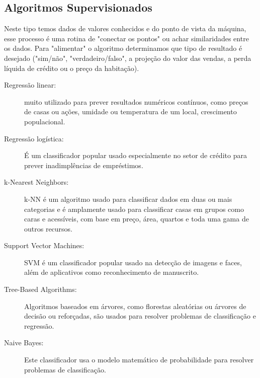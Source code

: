 \subsection{Algoritmos Supervisionados}
Neste tipo temos dados de valores conhecidos e do ponto de vista da máquina, esse processo é uma rotina de "conectar os pontos" ou achar similaridades entre os dados. Para "alimentar" o algoritmo determinamos que tipo de resultado é desejado ("sim/não", "verdadeiro/falso", a projeção do valor das vendas, a perda líquida de crédito ou o preço da habitação).
\begin{description}
	\item[Regressão linear:] muito utilizado para prever resultados numéricos contínuos, como preços de casas ou ações, umidade ou temperatura de um local, crescimento populacional.
	\item[Regressão logística:] É um classificador popular usado especialmente no setor de crédito para prever inadimplências de empréstimos.
	\item[k-Nearest Neighbors:] k-NN é um algoritmo usado para classificar dados em duas ou mais categorias e é amplamente usado para classificar casas em grupos como caras e acessíveis, com base em preço, área, quartos e toda uma gama de outros recursos.
	\item[Support Vector Machines:] SVM é um classificador popular usado na detecção de imagens e faces, além de aplicativos como reconhecimento de manuscrito.
	\item[Tree-Based Algorithms:] Algoritmos baseados em árvores, como florestas aleatórias ou árvores de decisão ou reforçadas, são usados para resolver problemas de classificação e regressão.
	\item[Naive Bayes:] Este classificador usa o modelo matemático de probabilidade para resolver problemas de classificação.
\end{description}

